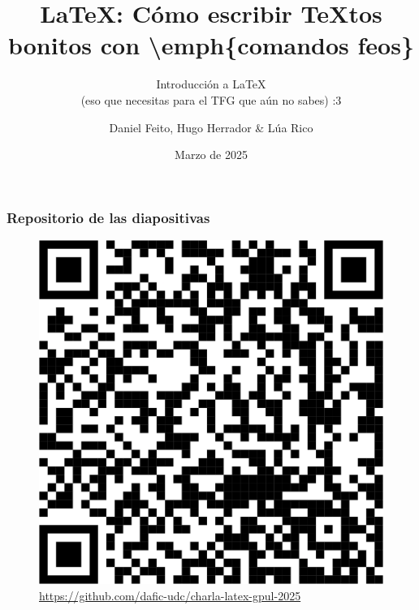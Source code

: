 \documentclass{beamer}
\title[Introducción a LaTeX]{\LaTeX: Cómo escribir TeXtos bonitos con \textbackslash emph\{comandos feos\}}
\subtitle{Introducción a LaTeX \\ (eso que necesitas para el TFG que aún no sabes) :3}
\author[Feito, Herrador \& Lúa]{Daniel Feito, Hugo Herrador \& Lúa Rico}
\institute{DAFIC $\times$ GPUL}
\date[GPUL School 2025]{Marzo de 2025}
\begin{document}
\frame{\titlepage}


\begin{frame}[fragile]
\frametitle{Repositorio de las diapositivas}

\begin{figure}
    \centering
    \includegraphics[width=0.5\linewidth]{images/QR.png}
    \caption{\url{https://github.com/dafic-udc/charla-latex-gpul-2025}}
\end{figure}

\end{frame}















\end{document}
